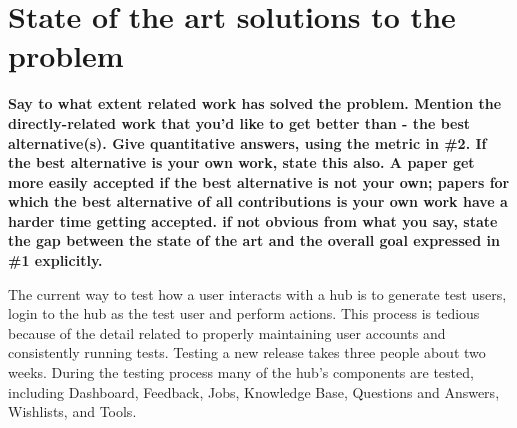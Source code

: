 \documentclass[letterpaper]{article}
\begin{document}
\section{State of the art solutions to the problem}

\textbf{
Say to what extent related work has solved the problem. Mention the
directly-related work that you'd like to get better than - the best
alternative(s). Give quantitative answers, using the metric in \#2. If the
best alternative is your own work, state this also. A paper get more easily
accepted if the best alternative is not your own; papers for which the best
alternative of all contributions is your own work have a harder time getting
accepted. if not obvious from what you say, state the gap between the state
of the art and the overall goal expressed in \#1 explicitly.
}

The current way to test how a user interacts with a hub is to generate test
users, login to the hub as the test user and perform actions. This process is
tedious because of the detail related to properly maintaining user accounts and
consistently running tests. Testing a new release takes three people about two
weeks. During the testing process many of the hub's components are tested,
including Dashboard, Feedback, Jobs, Knowledge Base, Questions and Answers,
Wishlists, and Tools.






\end{document}
